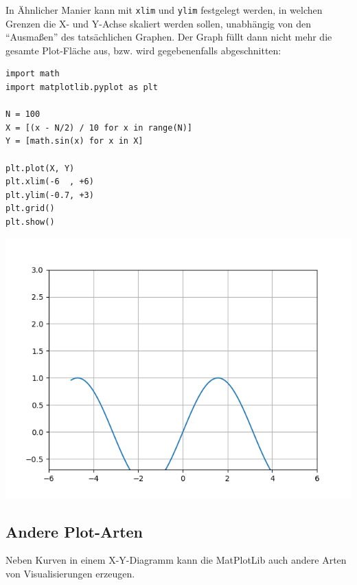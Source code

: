 In Ähnlicher Manier kann mit \texttt{xlim} und \texttt{ylim} festgelegt werden, in welchen Grenzen die X- und Y-Achse skaliert werden sollen, unabhängig von den \enquote{Ausmaßen} des tatsächlichen Graphen. Der Graph füllt dann nicht mehr die gesamte Plot-Fläche aus, bzw. wird gegebenenfalls abgeschnitten:

\begin{codebox}[Beispiel: Manuell gewählte Plot-Skalierung, width=.55\linewidth, nobeforeafter, equal height group = grpXmpSimplePlotScale]
\begin{verbatim}
import math
import matplotlib.pyplot as plt

N = 100
X = [(x - N/2) / 10 for x in range(N)]
Y = [math.sin(x) for x in X]

plt.plot(X, Y)
plt.xlim(-6  , +6)
plt.ylim(-0.7, +3)
plt.grid()
plt.show()
\end{verbatim}
\end{codebox}
%
\begin{tcolorbox}[title=Manuell gewählte Plot-Skalierung, width=.45\linewidth, nobeforeafter, equal height group = grpXmpSimplePlotScale]
	\includegraphics[width=\linewidth]{./gfx/plt-limits}
\end{tcolorbox}

\subsection{Andere Plot-Arten}
Neben Kurven in einem X-Y-Diagramm kann die MatPlotLib auch andere Arten von Visualisierungen erzeugen.

